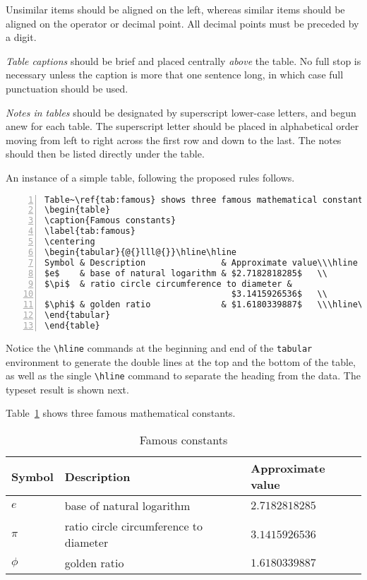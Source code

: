 \documentclass{cernphprep}
\begin{document}
Unsimilar items should be aligned on the left, whereas similar items
should be aligned on the operator or decimal point. All decimal points
must be preceded by a digit.

\emph{Table captions} should be brief and placed centrally
\emph{above} the table. No full stop is necessary unless the caption
is more that one sentence long, in which case full punctuation should
be used.

\emph{Notes in tables} should be designated by superscript lower-case
letters, and begun anew for each table. The superscript letter should
be placed in alphabetical order moving from left to right across the
first row and down to the last. The notes should then be listed
directly under the table.

An instance of a simple table, following the proposed rules follows.
\begin{Verbatim}[numbers=left,fontsize=\small]
Table~\ref{tab:famous} shows three famous mathematical constants.
\begin{table}
\caption{Famous constants}
\label{tab:famous}
\centering
\begin{tabular}{@{}lll@{}}\hline\hline
Symbol & Description               & Approximate value\\\hline
$e$    & base of natural logarithm & $2.7182818285$   \\
$\pi$  & ratio circle circumference to diameter &
                                     $3.1415926536$   \\
$\phi$ & golden ratio              & $1.6180339887$   \\\hline\hline
\end{tabular}
\end{table}
\end{Verbatim}
Notice the \verb!\hline! commands at the beginning and end of the
\texttt{tabular} environment to generate the double lines at the top
and the bottom of the table, as well as the single \verb!\hline! command
to separate the heading from the data. The typeset result is shown next.

Table~\ref{tab:famous} shows three famous mathematical constants.
\begin{table}[h]
\caption{Famous constants}
\label{tab:famous}
\centering
\begin{tabular}{@{}lll@{}}\hline\hline
Symbol & Description               & Approximate value\\\hline
$e$    & base of natural logarithm & $2.7182818285$   \\
$\pi$  & ratio circle circumference to diameter &
                                     $3.1415926536$   \\
$\phi$ & golden ratio              & $1.6180339887$   \\\hline\hline
\end{tabular}
\end{table}
\end{document}
